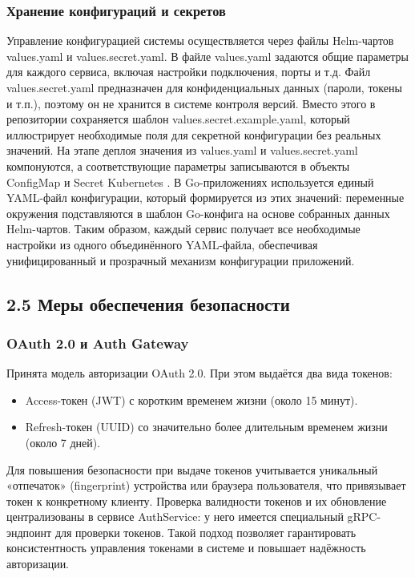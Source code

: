 \subsubsection*{Хранение конфигураций и секретов}
Управление конфигурацией системы осуществляется через файлы Helm-чартов values.yaml и values.secret.yaml. В файле values.yaml задаются общие параметры для каждого сервиса, включая настройки подключения, порты и т.д. Файл values.secret.yaml предназначен для конфиденциальных данных (пароли, токены и т.п.), поэтому он не хранится в системе контроля версий. Вместо этого в репозитории сохраняется шаблон values.secret.example.yaml, который иллюстрирует необходимые поля для секретной конфигурации без реальных значений. На этапе деплоя значения из values.yaml и values.secret.yaml компонуются, а соответствующие параметры записываются в объекты \\ ConfigMap и Secret Kubernetes \cite{3}\cite{4}. В Go-приложениях используется единый YAML-файл конфигурации, который формируется из этих значений: переменные окружения подставляются в шаблон Go-конфига на основе собранных данных Helm-чартов. Таким образом, каждый сервис получает все необходимые настройки из одного объединённого YAML-файла, обеспечивая унифицированный и прозрачный механизм конфигурации приложений.

\subsection*{2.5 Меры обеспечения безопасности}

\subsubsection*{OAuth 2.0 и Auth Gateway}
Принята модель авторизации OAuth 2.0. При этом выдаётся два вида токенов:
\begin{itemize}
    \item Access-токен (JWT) \cite{7} с коротким временем жизни (около 15 минут).
    \item Refresh-токен (UUID) со значительно более длительным временем жизни (около 7 дней).
\end{itemize}
Для повышения безопасности при выдаче токенов учитывается уникальный «отпечаток» (fingerprint) устройства или браузера пользователя, что привязывает токен к конкретному клиенту. Проверка валидности токенов и их обновление централизованы в сервисе AuthService: у него имеется специальный gRPC-эндпоинт для проверки токенов. Такой подход позволяет гарантировать консистентность управления токенами в системе и повышает надёжность авторизации.

